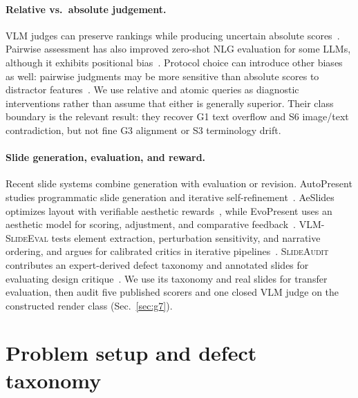 \documentclass[letterpaper]{article}            %
\newcommand{\g}[1]{\textsf{#1}}        %
\begin{document}
\paragraph{Relative vs.\ absolute judgement.}
VLM judges can preserve rankings while producing uncertain absolute scores~\citep{rankscore}.
Pairwise assessment has also improved zero-shot NLG evaluation for some LLMs, although it exhibits positional
bias~\citep{comparative}. Protocol choice can introduce other biases as well: pairwise judgments may be more
sensitive than absolute scores to distractor features~\citep{pairpoint}. We use relative and atomic queries as diagnostic interventions rather than assume that either is generally
superior. Their class boundary is the relevant result: they recover \g{G1} text overflow and \g{S6} image/text contradiction, but not fine
\g{G3} alignment or \g{S3} terminology drift.

\paragraph{Slide generation, evaluation, and reward.}
Recent slide systems combine generation with evaluation or revision. AutoPresent studies programmatic slide
generation and iterative self-refinement~\citep{autopresent}. AeSlides optimizes layout with verifiable aesthetic
rewards~\citep{aeslides}, while EvoPresent uses an aesthetic model for scoring, adjustment, and comparative
feedback~\citep{evopresent}. \textsc{VLM-SlideEval} tests element extraction, perturbation sensitivity, and
narrative ordering, and argues for calibrated critics in iterative pipelines~\citep{vlmslideeval}.
\textsc{SlideAudit} contributes an expert-derived defect taxonomy and annotated slides for evaluating design
critique~\citep{slideaudit}. We use its taxonomy and real slides for transfer evaluation, then audit five
published scorers and one closed VLM judge on the constructed render class (Sec.~\ref{sec:g7}).

\section{Problem setup and defect taxonomy}\label{sec:setup}
\end{document}
